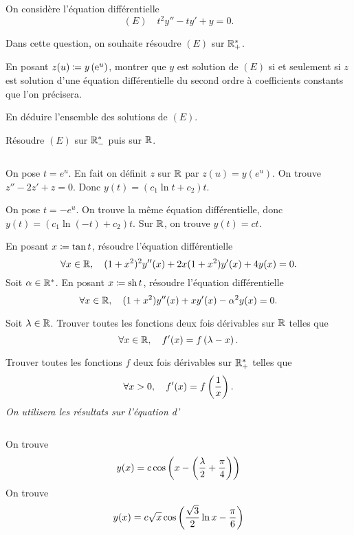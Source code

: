 \documentclass{magnolia}
\begin{document}






On considère l'équation différentielle
\[(E) \quad t^2y''-ty'+y=0.\]
\begin{questions}
\item Dans cette question, on souhaite résoudre $(E)$ sur $\mathbb{R}_+^*$.
  \begin{questions}
  \item En posant $z(u)\coloneqq y\left({\rm e}^u\right)$, montrer que $y$ est solution de $(E)$ si et
    seulement si $z$ est solution d'une équation différentielle du second ordre
    à coefficients constants que l'on précisera.
  \item En déduire l'ensemble des solutions de $(E)$.
  \end{questions}
\item Résoudre $(E)$ sur $\mathbb{R}_-^*$ puis sur $\mathbb{R}$.
\end{questions}
\begin{sol}
$\quad$
\begin{questions}
\question
  \begin{questions}
  \question On pose $t=e^u$. En fait on définit $z$ sur $\mathbb{R}$ par $z(u)=y(e^u)$.
    On trouve $z''-2z'+z=0$.
  \question Donc $y(t)=(c_1\ln t+c_2)t$.
  \end{questions}
\question On pose $t=-e^u$. On trouve la même équation différentielle,
  donc $y(t)=(c_1\ln(-t)+c_2)t$. Sur $\mathbb{R}$, on trouve $y(t)=ct$.
\end{questions}
\end{sol}

\begin{questions}
\question En posant $x\coloneqq \tan t$, résoudre l'équation différentielle
  \[\forall x\in\mathbb{R},\quad (1+x^2)^2 y''(x)+2x(1+x^2)y'(x)+4y(x)=0.\]
\question Soit $\alpha\in{\mathbb{R}^*}$. En posant $x\coloneqq \operatorname{sh} t$, résoudre l'équation différentielle
  \[\forall x\in\mathbb{R},\quad (1+x^2)y''(x)+xy'(x)-\alpha^2 y(x)=0.\]
\end{questions}

\begin{questions}
\item Soit $\lambda\in\mathbb{R}$. Trouver toutes les fonctions deux fois dérivables
  sur $\mathbb{R}$ telles que
  $$\forall x\in\mathbb{R} ,\quad f'(x)=f\left(\lambda-x\right).$$
\item Trouver toutes les fonctions $f$ deux fois dérivables sur $\mathbb{R}_+^*$ telles
  que
  $$\forall x>0 ,\quad f'(x)=f\left(\frac{1}{x}\right).$$
  {\it On utilisera les résultats sur l'équation d'}
\end{questions}
\begin{sol}
$\quad$
\begin{questions}
\question On trouve
  \[y(x)=c\cos\left(x-\left(\frac{\lambda}{2}+\frac{\pi}{4}\right)\right)\]
\question On trouve
  \[y(x)=c\sqrt{x}\cos\left(\frac{\sqrt{3}}{2}\ln x-\frac{\pi}{6}\right)\]
\end{questions}
\end{sol}
\end{document}
